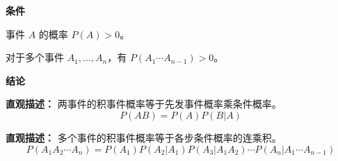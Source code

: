 \begin{statementbox}
	\textbf{\textcolor{CStatement}{条件}}
	\begin{description}[style=nextline, leftmargin=2.8em, labelsep=0.5em, itemsep=0.35em]
		\item[\textbf{\textcolor{CStatement}{条件1（事件概率正）：}}] 事件 $A$ 的概率 $P(A)>0$。
		\item[\textbf{\textcolor{CStatement}{条件2（概率积正）：}}] 对于多个事件 $A_1,\dots,A_n$，有 $P(A_1\cdots A_{n-1})>0$。
	\end{description}

	\textbf{\textcolor{CStatement}{结论}}
	\begin{description}[style=nextline, leftmargin=2.8em, labelsep=0.5em, itemsep=0.45em]
		\item[\textbf{\textcolor{CStatement}{结论一（两事件公式）：}}]
			\textbf{\textcolor{CStatement}{直观描述：}}
			两事件的积事件概率等于先发事件概率乘条件概率。
			\[
				P(AB)=P(A)P(B|A)
			\]

		\item[\textbf{\textcolor{CStatement}{推广结论（多事件公式）：}}]
			\textbf{\textcolor{CStatement}{直观描述：}}
			多个事件的积事件概率等于各步条件概率的连乘积。
			\[
				P(A_1A_2\cdots A_n)=P(A_1)P(A_2|A_1)P(A_3|A_1A_2)\cdots P(A_n|A_1\cdots A_{n-1})
			\]
	\end{description}
\end{statementbox}
